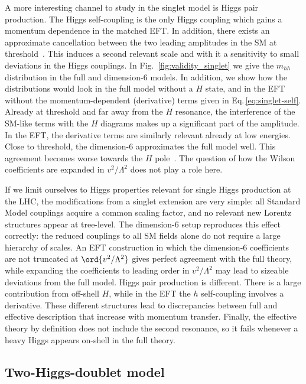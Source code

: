 A more interesting channel to study in the singlet model is Higgs pair
production. The Higgs self-coupling is the only Higgs coupling which
gains a momentum dependence in the matched EFT. In addition, there
exists an approximate cancellation between the two leading amplitudes
in the SM at threshold~\cite{hh_threshold}.  This induces a second
relevant scale and with it a sensitivity to small deviations in the
Higgs couplings.  In Fig.~\ref{fig:validity_singlet} we give the $m_{hh}$
distribution in the full and dimension-6 models.  In addition, we show
how the distributions would look in the full model without a $H$
state, and in the EFT without the momentum-dependent (derivative)
terms given in Eq.\,\eqref{eq:singlet-self}.  Already at threshold and
far away from the $H$ resonance, the interference of the SM-like terms
with the $H$ diagrams makes up a significant part of the amplitude.
In the EFT, the derivative terms are similarly relevant already at low
energies. Close to threshold, the dimension-6 approximates the full
model well. This agreement becomes worse towards the $H$
pole~\cite{hh-breakdown}. The question of how the Wilson coefficients
are expanded in $v^2/\Lambda^2$ does not play a role here.\medskip

If we limit ourselves to Higgs properties relevant for single Higgs
production at the LHC, the modifications from a singlet extension are
very simple: all Standard Model couplings acquire a common scaling
factor, and no relevant new Lorentz structures appear at tree-level.
The dimension-6 setup reproduces this effect correctly: the reduced
couplings to all SM fields alone do not require a large hierarchy of
scales.  An EFT construction in which the dimension-6 coefficients are
not truncated at $\ord{v^2/\Lambda^2}$ gives perfect agreement with
the full theory, while expanding the coefficients to leading order in
$v^2/\Lambda^2$ may lead to sizeable deviations from the full model.
Higgs pair production is different. There is a large contribution from
off-shell $H$, while in the EFT the $h$ self-coupling involves a
derivative. These different structures lead to discrepancies between
full and effective description that increase with momentum
transfer. Finally, the effective theory by definition does not include
the second resonance, so it fails whenever a heavy Higgs appears
on-shell in the full theory.



\subsection{Two-Higgs-doublet model}
\label{sec:validity_2hdm}

